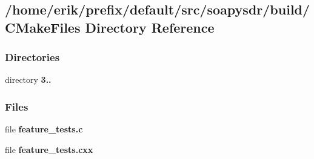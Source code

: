 \subsection{/home/erik/prefix/default/src/soapysdr/build/\+C\+Make\+Files Directory Reference}
\label{dir_af084623f801704b553601e6d65a4a47}
\subsubsection*{Directories}
\begin{DoxyCompactItemize}
\item 
directory {\bf 3..}
\end{DoxyCompactItemize}
\subsubsection*{Files}
\begin{DoxyCompactItemize}
\item 
file {\bf feature\+\_\+tests.\+c}
\item 
file {\bf feature\+\_\+tests.\+cxx}
\end{DoxyCompactItemize}
